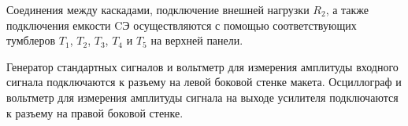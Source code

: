 Соединения между каскадами, подключение внешней нагрузки $R_2$, а также подключения емкости CЭ осуществляются с помощью соответствующих тумблеров $T_1$, $T_2$, $T_3$, $T_4$ и $T_5$ на верхней панели.

Генератор стандартных сигналов и вольтметр для измерения амплитуды входного сигнала подключаются к разъему на левой боковой стенке макета. Осциллограф и вольтметр для измерения амплитуды сигнала на выходе усилителя подключаются к разъему на правой боковой стенке.



